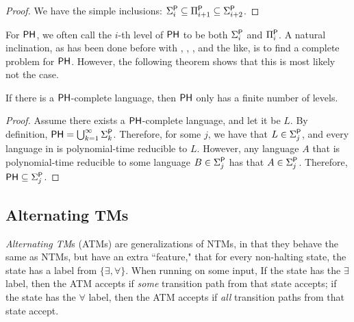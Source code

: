 \begin{proof}
We have the simple inclusions: $\Sigma_i^\P \subseteq \Pi_{i+1}^\P \subseteq \Sigma_{i+2}^\P$.
\end{proof}

For $\PH$, we often call the $i$-th level of $\PH$ to be both $\Sigma_i^\text{\P}$ and $\Pi_i^\text{\P}$. A natural inclination, as has been done before with \NP, \PSPACE, \NL, and the like, is to find a complete problem for $\PH$. However, the following theorem shows that this is most likely not the case.

\begin{theorem}
If there is a $\PH$-complete language, then $\PH$ only has a finite number of levels.
\end{theorem}

\begin{proof}
Assume there exists a $\PH$-complete language, and let it be $L$. By definition, $\PH = \bigcup_{k = 1}^{\infty} \Sigma_k^{\text{\P}}$. Therefore, for some $j$, we have that $L \in \Sigma_j^\P$, and every language in \PH is polynomial-time reducible to $L$. However, any language $A$ that is polynomial-time reducible to some language $B \in \Sigma_j^\P$ has that $A \in \Sigma_j^\P$. Therefore, $\PH \subseteq \Sigma_j^\P$.
\end{proof}

\subsection{Alternating TMs}
\begin{definition}
\emph{Alternating TM}s (ATMs) are generalizations of NTMs, in that they behave the same as NTMs, but have an extra ``feature," that for every non-halting state, the state has a label from $\{\exists, \forall\}$. When running on some input, If the state has the $\exists$ label, then the ATM accepts if \emph{some} transition path from that state accepts; if the state has the $\forall$ label, then the ATM accepts if \emph{all} transition paths from that state accept.
\end{definition}